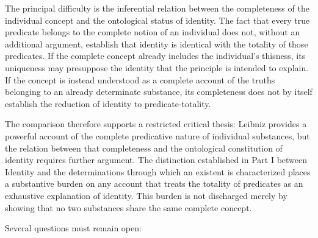 \label{para:VS.B01.P01.C08.S07.SS11.P002}

The principal difficulty is the inferential
relation between the completeness of the
individual concept and the ontological
status of identity. The fact that every
true predicate belongs to the complete
notion of an individual does not, without
an additional argument, establish that
identity is identical with the totality
of those predicates. If the complete
concept already includes the individual's
thisness, its uniqueness may presuppose
the identity that the principle is intended
to explain. If the concept is instead
understood as a complete account of the
truths belonging to an already determinate
substance, its completeness does not
by itself establish the reduction of
identity to predicate-totality.

\label{para:VS.B01.P01.C08.S07.SS11.P003}

The comparison therefore supports a restricted
critical thesis: Leibniz provides a powerful
account of the complete predicative nature
of individual substances, but the relation
between that completeness and the ontological
constitution of identity requires further
argument. The distinction established in
Part I between Identity and the determinations
through which an existent is characterized
places a substantive burden on any account
that treats the totality of predicates
as an exhaustive explanation of identity.
This burden is not discharged merely by
showing that no two substances share the
same complete concept. \cite{AdamsPrimitiveThisness1979}
\cite{RodriguezPereyraIdentitySEP2025}

\label{para:VS.B01.P01.C08.S07.SS11.P004}

Several questions must remain open:

